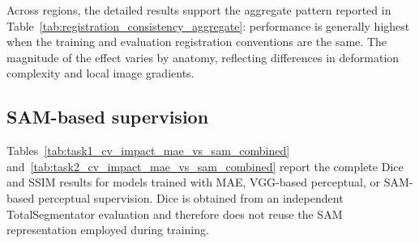 \documentclass[lettersize,journal]{IEEEtran}
\begin{document}
Across regions, the detailed results support the aggregate pattern reported in Table~\ref{tab:registration_consistency_aggregate}: performance is generally highest when the training and evaluation registration conventions are the same. The magnitude of the effect varies by anatomy, reflecting differences in deformation complexity and local image gradients.

\subsection{SAM-based supervision}
\label{app:sam_results}

Tables~\ref{tab:task1_cv_impact_mae_vs_sam_combined} and~\ref{tab:task2_cv_impact_mae_vs_sam_combined} report the complete Dice and SSIM results for models trained with MAE, VGG-based perceptual, or SAM-based perceptual supervision. Dice is obtained from an independent TotalSegmentator evaluation and therefore does not reuse the SAM representation employed during training.
\end{document}
